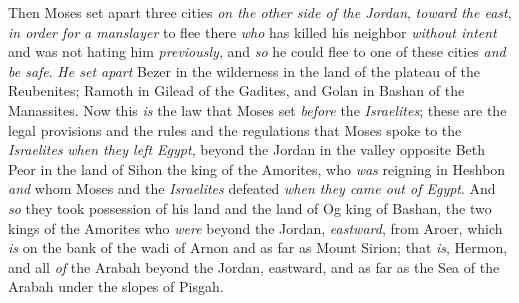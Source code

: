 \begin{biblechapter}
\verse Then Moses set apart three cities \textit{on the other side of the Jordan}, \textit{toward the east},
\verse \textit{in order for} \textit{a manslayer} to flee there \textit{who} has killed his neighbor \textit{without intent} and was not hating him \textit{previously}, and \textit{so} he could flee to one of these cities \textit{and be safe}.
\verse \textit{He set apart} Bezer in the wilderness in the land of the plateau of the Reubenites; Ramoth in Gilead of the Gadites, and Golan in Bashan of the Manassites.
\verse Now this \textit{is} the law that Moses set \textit{before} the \textit{Israelites};
\verse these are the legal provisions and the rules and the regulations that Moses spoke to the \textit{Israelites} \textit{when they left Egypt},
\verse beyond the Jordan in the valley opposite Beth Peor in the land of Sihon the king of the Amorites, who \textit{was} reigning in Heshbon \textit{and} whom Moses and the \textit{Israelites} defeated \textit{when they came out of Egypt}.
\verse And \textit{so} they took possession of his land and the land of Og king of Bashan, the two kings of the Amorites who \textit{were} beyond the Jordan, \textit{eastward},
\verse from Aroer, which \textit{is} on the bank of the wadi of Arnon and as far as Mount Sirion; that \textit{is}, Hermon,
\verse and all \textit{of} the Arabah beyond the Jordan, eastward, and as far as the Sea of the Arabah under the slopes of Pisgah.
\end{biblechapter}


